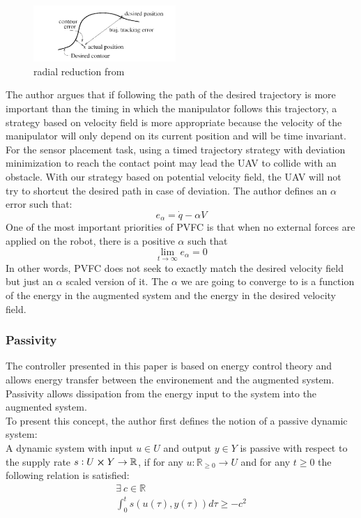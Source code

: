 \begin{figure}[h!]
    \centering
    \includegraphics[width=0.48\textwidth]{Images/radialreduction.png}
    \caption{radial reduction from \cite{li1999passive}}
    \label{fig:radialreduction}
\end{figure} 
The author argues that if following the path of the desired trajectory is more important than the timing in which the manipulator follows this trajectory, a strategy based on velocity field is more appropriate because the velocity of the manipulator will only depend on its current position and will be time invariant.  
For the sensor placement task, using a timed trajectory strategy with deviation minimization to reach the contact point may lead the UAV to collide with an obstacle. With our strategy based on potential velocity field, the UAV will not try to shortcut the desired path in case of deviation.
The author defines an $\alpha$ error such that:
\begin{equation}
    e_{\alpha} = \dot{q} - \alpha V \label{alphaerror}
\end{equation}
One of the most important priorities of PVFC is that when no external forces are applied on the robot, there is a positive $\alpha$ such that 
\begin{equation}
    \lim_{t\to\infty}e_{\alpha} = 0
\end{equation}
In other words, PVFC does not seek to exactly match the desired velocity field but just an $\alpha$ scaled version of it. The $\alpha$ we are going to converge to is a function of the energy in the augmented system and the energy in the desired velocity field.
\subsubsection{Passivity}
The controller presented in this paper is based on energy control theory and allows energy transfer between the environement and the augmented system.
Passivity allows dissipation from the energy input to the system into the augmented system. \\
To present this concept, the author first defines the notion of a passive dynamic system:\\
A dynamic system with input $u \in U$ and output $y \in Y$ is passive with respect to the supply rate 
$s:U \cross Y \rightarrow \mathbb R$, if for any $u: \mathbb R_{\ge 0} \rightarrow U $ and for any $t\geq 0$ the following relation is satisfied:
\begin{align}
    \exists ~ c\in\mathbb R  \nonumber\\
    \int_{0}^{t}s(u(\tau),y(\tau))d\tau \geq -c^2 \label{passivityCondition}
\end{align}

